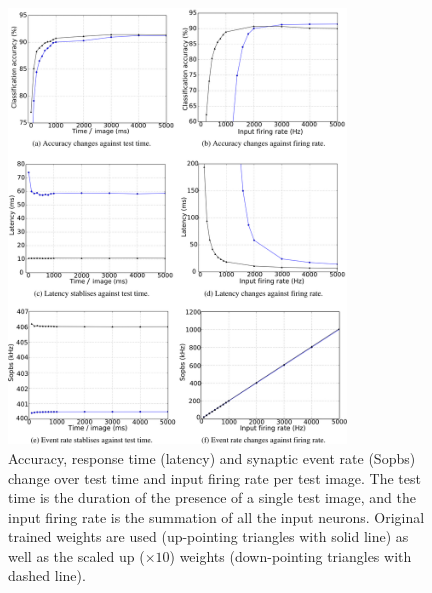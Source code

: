 \begin{figure}[htb!]
	\centering
	\includegraphics[width=0.8\textwidth]{pics_bench/fig7}
	\caption{Accuracy, response time (latency) and synaptic event rate (Sopbs) change over test time and input firing rate per test image.
		The test time is the duration of the presence of a single test image, and the input firing rate is the summation of all the input neurons.
		Original trained weights are used (up-pointing triangles with solid line) as well as the scaled up ($\times10$) weights (down-pointing triangles with dashed line). }
	\label{fig:assess}
\end{figure}

